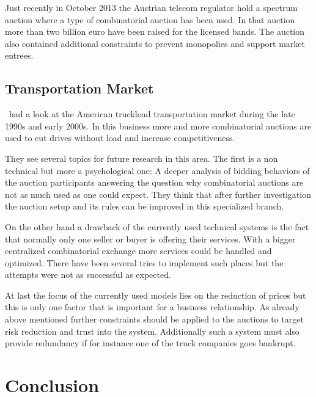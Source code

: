 \documentclass[a4paper]{paper}
\begin{document}
Just recently in October 2013 the Austrian telecom regulator hold a spectrum auction where a type of combinatorial auction has been used. In that auction more than two billion euro have been raised for the licensed bands. The auction also contained additional constraints to prevent monopolies and support market entrees.~\cite{RTR:Telecom}

\subsection{Transportation Market}
\cite{CS06}~had a look at the American truckload transportation market during the late 1990s and early 2000s. In this business more and more combinatorial auctions are used to cut drives without load and increase competitiveness.

They see several topics for future research in this area. The first is a non technical but more a psychological one: A deeper analysis of bidding behaviors of the auction participants answering the question why combinatorial auctions are not as much used as one could expect. They think that after further investigation the auction setup and its rules can be improved in this specialized branch.

On the other hand a drawback of the currently used technical systems is the fact that normally only one seller or buyer is offering their services. With a bigger centralized combinatorial exchange more services could be handled and optimized. There have been several tries to implement such places but the attempts were not as successful as expected.

At last the focus of the currently used models lies on the reduction of prices but this is only one factor that is important for a business relationship. As already above mentioned further constraints should be applied to the auctions to target risk reduction and trust into the system. Additionally such a system must also provide redundancy if for instance one of the truck companies goes bankrupt. 

\section{Conclusion}
\end{document}
